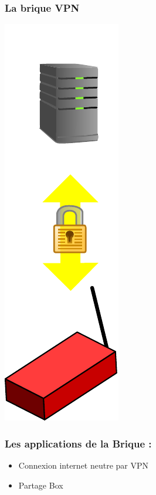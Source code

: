 \documentclass[notes=hide]{beamer}
\begin{document}
\begin{frame}[t]
\frametitle{\textcolor{titre}{La brique VPN}}
\vfill
\begin{center}
\includegraphics[scale=0.5]{img2/vpn.pdf}
\end{center}
\end{frame}

\begin{frame}[t]
\frametitle{\textcolor{titre}{Les applications de la Brique :}}
\vfill
\begin{center}
\begin{itemize}
    \item Connexion internet neutre par VPN
    \item Partage Box
\end{itemize}
\end{center}
\end{frame}
\end{document}
